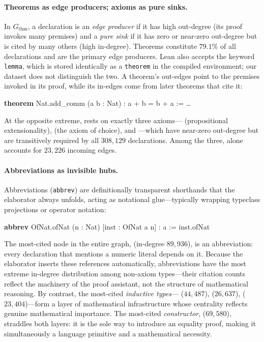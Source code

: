 \paragraph{Theorems as edge producers; axioms as pure sinks.}
In $G_{\mathrm{thm}}$, a declaration is an \emph{edge producer} if it has high out-degree (its proof invokes many premises) and a \emph{pure sink} if it has zero or near-zero out-degree but is cited by many others (high in-degree). Theorems constitute $79.1\%$ of all declarations and are the primary edge producers. Lean also accepts the keyword \texttt{lemma}, which is stored identically as a \texttt{theorem} in the compiled environment; our dataset does not distinguish the two. A theorem's out-edges point to the premises invoked in its proof, while its in-edges come from later theorems that cite it:

\begin{codebox}
\textbf{theorem} \textcolor{red!70!black}{Nat.add\_comm} (a b : Nat) : a + b = b + a := \ldots
\end{codebox}

\noindent
At the opposite extreme,  rests on exactly three axioms--- (propositional extensionality),  (the axiom of choice), and ---which have near-zero out-degree but are transitively required by all $308{,}129$ declarations. Among the three,  alone accounts for $23{,}226$ incoming edges.

\paragraph{Abbreviations as invisible hubs.}
Abbreviations (\texttt{abbrev}) are definitionally transparent shorthands that the elaborator always unfolds, acting as notational glue---typically wrapping typeclass projections or operator notation:

\begin{codebox}
\textbf{abbrev} \textcolor{red!70!black}{OfNat.ofNat} (n : Nat) [inst : OfNat a n] : a := inst.ofNat
\end{codebox}

\noindent
The most-cited node in the entire graph,  (in-degree $89{,}936$), is an abbreviation: every declaration that mentions a numeric literal depends on it. Because the elaborator inserts these references automatically, abbreviations have the most extreme in-degree distribution among non-axiom types---their citation counts reflect the machinery of the proof assistant, not the structure of mathematical reasoning. By contrast, the most-cited \emph{inductive types}--- ($44{,}487$),  ($26{,}637$),  ($23{,}404$)---form a layer of mathematical infrastructure whose centrality reflects genuine mathematical importance. The most-cited \emph{constructor},  ($69{,}580$), straddles both layers: it is the sole way to introduce an equality proof, making it simultaneously a language primitive and a mathematical necessity.

